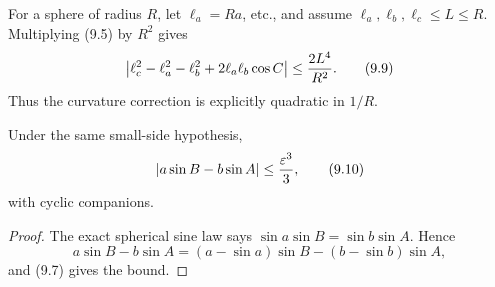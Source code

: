 For a sphere of radius \(R\), let \(\ell_a=Ra\), etc., and assume
\(\ell_a,\ell_b,\ell_c\le L\le R\).  Multiplying (9.5) by \(R^2\) gives
\begin{equation}
 \left|\ell_c^2-\ell_a^2-\ell_b^2+2\ell_a\ell_b\cos C\right|
 \le\frac{2L^4}{R^2}.                                      \tag{9.9}
\end{equation}
Thus the curvature correction is explicitly quadratic in \(1/R\).

\begin{corollary}
Under the same small-side hypothesis,
\begin{equation}
 \left|a\sin B-b\sin A\right|\le\frac{\varepsilon^3}{3},          \tag{9.10}
\end{equation}
with cyclic companions.
\end{corollary}

\begin{proof}
The exact spherical sine law says
\(\sin a\sin B=\sin b\sin A\).  Hence
\[
 a\sin B-b\sin A
 =(a-\sin a)\sin B-(b-\sin b)\sin A,
\]
and (9.7) gives the bound.
\end{proof}

